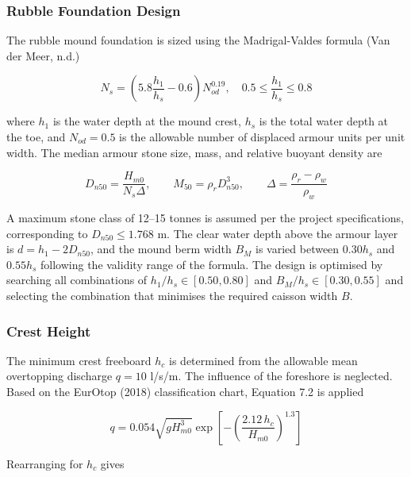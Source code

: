 \documentclass[a4paper, 11pt]{article}
\begin{document}
\subsubsection{Rubble Foundation Design}

\hspace*{0.5cm} The rubble mound foundation is sized using the Madrigal-Valdes formula (Van der Meer, n.d.)

\begin{equation}
    N_s = \left(5.8\frac{h_1}{h_s} - 0.6\right) N_{od}^{0.19}, \quad 0.5 \leq \frac{h_1}{h_s} \leq 0.8
\end{equation}

where $h_1$ is the water depth at the mound crest, $h_s$ is the total water depth at the toe, and $N_{od} = 0.5$ is the allowable number of displaced armour units per unit width. The median armour stone size, mass, and relative buoyant density are

\begin{equation}
    D_{n50} = \frac{H_{m0}}{N_s \Delta}, \qquad M_{50} = \rho_r D_{n50}^3, \qquad \Delta = \frac{\rho_r - \rho_w}{\rho_w}
\end{equation}

A maximum stone class of 12--15 tonnes is assumed per the project specifications, corresponding to $D_{n50} \leq 1.768$ m. The clear water depth above the armour layer is $d = h_1 - 2D_{n50}$, and the mound berm width $B_M$ is varied between $0.30h_s$ and $0.55h_s$ following the validity range of the formula. The design is optimised by searching all combinations of $h_1/h_s \in [0.50, 0.80]$ and $B_M/h_s \in [0.30, 0.55]$ and selecting the combination that minimises the required caisson width $B$.

\subsubsection{Crest Height}

\hspace*{0.5cm} The minimum crest freeboard $h_c$ is determined from the allowable mean overtopping discharge $q = 10$ l/s/m. The influence of the foreshore is neglected. Based on the EurOtop (2018) classification chart, Equation 7.2 is applied

\begin{equation}
    q = 0.054\sqrt{gH_{m0}^3} \exp\!\left[-\left(\frac{2.12\, h_c}{H_{m0}}\right)^{1.3}\right]
\end{equation}

Rearranging for $h_c$ gives
\end{document}
